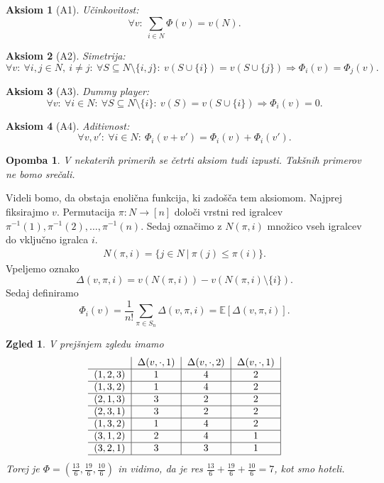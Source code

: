 \documentclass[10pt, a4paper]{article}
\newtheorem{aksiom}{Aksiom}[section]
\newtheorem*{opomba}{Opomba}
\newtheorem{zgled}[izr]{Zgled}
\begin{document}
\begin{aksiom}[A1]
  Učinkovitost:
  $$\forall v:\ \sum_{i \in N} \Phi(v) = v(N).$$
\end{aksiom}

\begin{aksiom}[A2]
  Simetrija:
  $$\forall v:\ \forall i, j \in N,\ i \neq j:\ \forall S \subseteq N\setminus \{i, j\}:\ v(S \cup \{i\}) = v (S \cup \{j\}) \Rightarrow \Phi_i (v) = \Phi_j (v).$$ 
\end{aksiom}

\begin{aksiom}[A3]
  Dummy player:  
  $$\forall v:\ \forall i \in N:\ \forall S \subseteq N \setminus \{i\}:\ v(S) = v(S \cup \{i\}) \Rightarrow \Phi_i (v) = 0.$$
\end{aksiom}

\begin{aksiom}[A4]
  Aditivnost: 
  $$\forall v, v':\ \forall i \in N:\ \Phi_i (v + v') = \Phi_i (v) + \Phi_i (v').$$
\end{aksiom}

\begin{opomba}
  V nekaterih primerih se četrti aksiom tudi izpusti.
  Takšnih primerov ne bomo srečali.
\end{opomba}

Videli bomo, da obstaja enolična funkcija, ki zadošča tem aksiomom.
Najprej fiksirajmo $v$. Permutacija $\pi: N \to [n]$ določi vrstni red 
igralcev $\pi^{-1} (1), \pi^{-1} (2),\dots, \pi^{-1} (n)$.
Sedaj označimo z $N(\pi, i)$ množico vseh igralcev do vključno igralca $i$.
\begin{align*}
  N(\pi, i) = \{j \in N\ |\ \pi(j) \leq \pi (i)\}.
\end{align*}
Vpeljemo oznako 
$$\Delta(v, \pi, i) = v(N(\pi, i)) - v (N(\pi, i) \setminus \{i\}).$$
Sedaj definiramo 
\begin{equation}
  \Phi_i (v) = \frac{1}{n!} \sum_{\pi \in S_n} \Delta (v, \pi, i) = \mathbb{E} [\Delta(v, \pi, i)].\tag{$5$} \label{eq:5}
\end{equation}

\begin{zgled}
  V prejšnjem zgledu imamo 
  $$
    {\begin{tabular}{c|c|c|c|}
        & $\Delta(v,\cdot, 1)$ & $\Delta(v,\cdot, 2)$ & $\Delta(v,\cdot, 1)$\\
        \hline
        $(1, 2, 3)$ & 1 & 4 & 2\\
        \hline
        $(1, 3, 2)$ & 1 & 4 & 2\\
        \hline
        $(2, 1, 3)$ & 3 & 2 & 2\\
        \hline
        $(2, 3, 1)$ & 3 & 2 & 2\\
        \hline
        $(1, 3, 2)$ & 1 & 4 & 2\\
        \hline
        $(3, 1, 2)$ & 2 & 4 & 1\\
        \hline 
        $(3, 2, 1)$ & 3 & 3 & 1\\
        \hline
    \end{tabular}}        
  $$    
    Torej je $\Phi = \left(\frac{13}{6}, \frac{19}{6}, \frac{10}{6}\right)$ in vidimo, da je res $\frac{13}{6}+\frac{19}{6}+\frac{10}{6} = 7$,
    kot smo hoteli.
\end{zgled}
\end{document}
